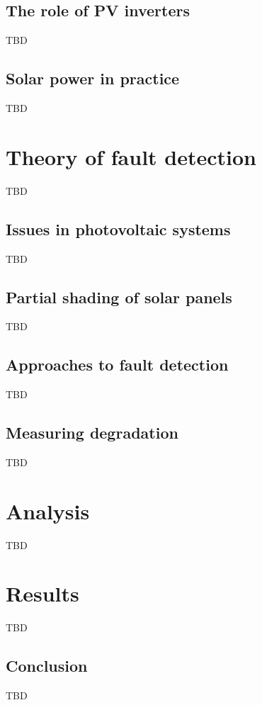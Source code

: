 
\section{The role of PV inverters}
TBD

\section{Solar power in practice}
TBD


\chapter{Theory of fault detection}
TBD

\section{Issues in photovoltaic systems}
TBD

\section{Partial shading of solar panels}
TBD

\section{Approaches to fault detection}
TBD

\section{Measuring degradation}
TBD


\chapter{Analysis}
TBD


\chapter{Results}
TBD

\section{Conclusion}
TBD





